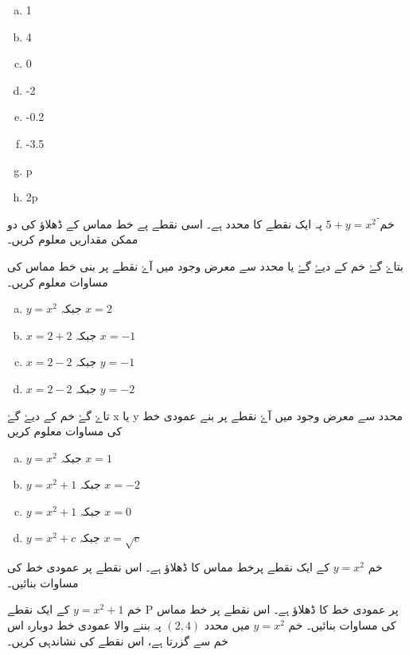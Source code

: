 \begin{enumerate}[a.]
\item1
\item4
\item0
\item-2
\item-0.2
\item-3.5
\item p
\item 2p
\end{enumerate}


خم  \(5+ y=x^{2} ۤۤ\) پہ ایک نقطے  کا    محدد  ہے۔ اسی نقطے پے خط مماس کے ڈھلاؤ کی دو ممکن مقداریں معلوم کریں۔

 بتاۓ گۓ خم کے دیۓ گۓ یا    محدد سے معرض وجود میں آۓ نقطے پر بنی خط مماس کی مساوات معلوم کریں۔
\begin{enumerate}[a.]
\item \( y=x^{2}\) جبکہ \( x=2\)
\item \( x=2 +2 \)  جبکہ \( x=-1\)
\item \( x=2 -2 \)   جبکہ    \( y=-1\)
\item  \( x=2 -2 \)  جبکہ    \( y=-2\)
\end{enumerate}


تاۓ گۓ خم کے دیۓ گۓ x  یا   y محدد سے معرض وجود میں آۓ نقطے پر بنے عمودی خط  کی مساوات معلوم کریں  
\begin{enumerate}[a.]
\item \( y=x^{2}\)        جبکہ      \(x=1\)
\item \( y=x^{2}+1\)   جبکہ       \(x=-2\)        
\item \( y=x^{2}+1\)     جبکہ      \(x=0\)
\item \( y=x^{2}+c\)     جبکہ       \(x=\sqrt{c}\)
\end{enumerate}

خم \( y=x^{2}\) کے ایک نقطے پرخط مماس کا ڈھلاؤ  ہے۔ اس نقطے  پر عمودی خط کی مساوات بنائیں۔


خم  \( y=x^{2}+1\) کے ایک نقطے P پر عمودی خط  کا ڈھلاؤ ہے۔ اس نقطے پر  خط مماس  کی مساوات بنائیں۔
خم \( y=x^{2}\) میں محدد \( (2,4) \) پہ بننے والا عمودی خط دوبارہ اس خم سے گزرتا ہے، اس نقطے کی نشاندہی کریں۔

